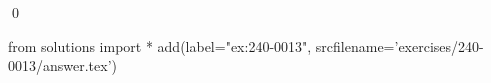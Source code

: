 
\begin{ex} 
  \label{ex:240-0013}
  
  \qed
\end{ex} 
\begin{python0}
from solutions import *
add(label="ex:240-0013",
    srcfilename='exercises/240-0013/answer.tex') 
\end{python0}
